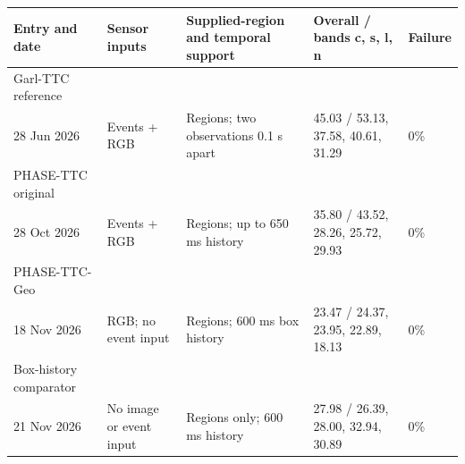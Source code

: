 \begin{tabularx}{\linewidth}{@{}p{.17\linewidth}p{.13\linewidth}p{.17\linewidth}Xp{.08\linewidth}@{}}
\toprule
Entry and date & Sensor inputs & Supplied-region and temporal support & Overall / bands c, s, l, n & Failure \\
\midrule
Garl-TTC reference\\28 Jun 2026 & Events + RGB & Regions; two observations 0.1 s apart & 45.03 / 53.13, 37.58, 40.61, 31.29 & 0\% \\
PHASE-TTC original\\28 Oct 2026 & Events + RGB & Regions; up to 650 ms history & 35.80 / 43.52, 28.26, 25.72, 29.93 & 0\% \\
PHASE-TTC-Geo\\18 Nov 2026 & RGB; no event input & Regions; 600 ms box history & 23.47 / 24.37, 23.95, 22.89, 18.13 & 0\% \\
Box-history comparator\\21 Nov 2026 & No image or event input & Regions only; 600 ms history & 27.98 / 26.39, 28.00, 32.94, 30.89 & 0\% \\
\bottomrule
\end{tabularx}
